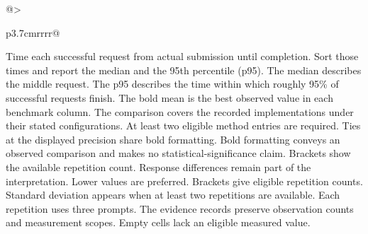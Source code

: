 \documentclass[conference,onecolumn]{IEEEtran}
\begin{document}
\begin{table}[!htp]
\begin{tabular}{@{}>{\raggedright\arraybackslash}p{3.7cm}rrrr@{}}
\bottomrule
\end{tabular}\par\medskip
\begin{minipage}{\linewidth}\footnotesize
Time each successful request from actual submission until completion. Sort those times and report the median and the 95th percentile (p95). The median describes the middle request. The p95 describes the time within which roughly 95\% of successful requests finish.
The bold mean is the best observed value in each benchmark column. The comparison covers the recorded implementations under their stated configurations. At least two eligible method entries are required. Ties at the displayed precision share bold formatting. Bold formatting conveys an observed comparison and makes no statistical-significance claim. Brackets show the available repetition count. Response differences remain part of the interpretation. Lower values are preferred.
Brackets give eligible repetition counts. Standard deviation appears when at least two repetitions are available. Each repetition uses three prompts. The evidence records preserve observation counts and measurement scopes. Empty cells lack an eligible measured value.
\end{minipage}
\end{table}
\end{document}
